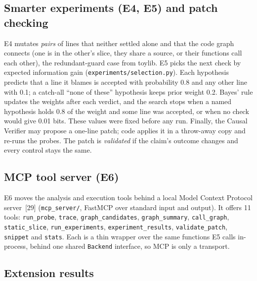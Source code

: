 \documentclass[10pt,a4paper]{article}
\newcommand{\code}[1]{\texttt{\small #1}}
\begin{document}
\subsection{Smarter experiments (E4, E5) and patch checking}

E4 mutates \emph{pairs} of lines that neither settled alone and that the code graph connects (one is in the other's
slice, they share a source, or their functions call each other), the redundant-guard case from toylib. E5 picks the next
check by expected information gain (\code{experiments/selection.py}). Each hypothesis predicts that a line it blames is
accepted with probability 0.8 and any other line with 0.1; a catch-all ``none of these'' hypothesis keeps prior weight
0.2. Bayes' rule updates the weights after each verdict, and the search stops when a named hypothesis holds 0.8 of the
weight and some line was accepted, or when no check would give 0.01 bits. These values were fixed before any run.
Finally, the Causal Verifier may propose a one-line patch; code applies it in a throw-away copy and re-runs the probes.
The patch is \emph{validated} if the claim's outcome changes and every control stays the same.

\subsection{MCP tool server (E6)}

E6 moves the analysis and execution tools behind a local Model Context Protocol server~[29] (\code{mcp\_server/},
FastMCP over standard input and output). It offers 11 tools: \code{run\_probe}, \code{trace},
\code{graph\_candidates}, \code{graph\_summary}, \code{call\_graph}, \code{static\_slice}, \code{run\_experiments},
\code{experiment\_results}, \code{validate\_patch}, \code{snippet} and \code{stats}. Each is a thin wrapper over the same
functions E5 calls in-process, behind one shared \code{Backend} interface, so MCP is only a transport.

\subsection{Extension results}
\end{document}
